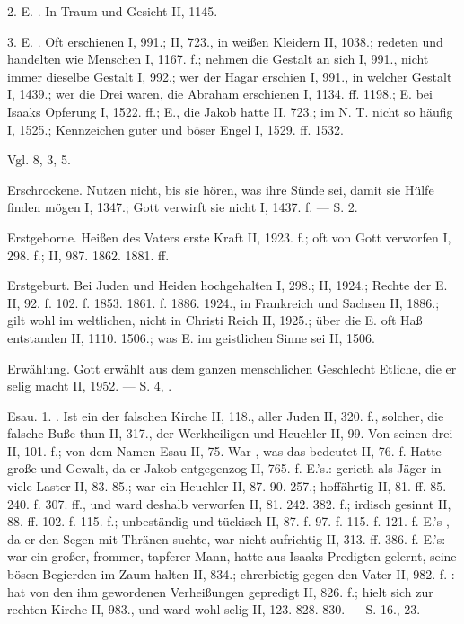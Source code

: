 2. E. . In Traum und Gesicht II, 1145.

3. E. . Oft erschienen I, 991.; II, 723., in weißen Kleidern II, 1038.; redeten und handelten wie Menschen I, 1167. f.; nehmen die Gestalt an sich I, 991., nicht immer dieselbe Gestalt I, 992.; wer der Hagar erschien I, 991., in welcher Gestalt I, 1439.; wer die Drei waren, die Abraham erschienen I, 1134. ff. 1198.; E. bei Isaaks Opferung I, 1522. ff.; E., die Jakob hatte II, 723.; im N. T. nicht so häufig I, 1525.; Kennzeichen guter und böser Engel I, 1529. ff. 1532.

Vgl.  8,  3,  5.

Erschrockene. Nutzen nicht, bis sie hören, was ihre Sünde sei, damit sie Hülfe finden mögen I, 1347.; Gott verwirft sie nicht I, 1437. f. — S.  2.

Erstgeborne. Heißen des Vaters erste Kraft II, 1923. f.; oft von Gott verworfen I, 298. f.; II, 987. 1862. 1881. ff.

Erstgeburt. Bei Juden und Heiden hochgehalten I, 298.; II, 1924.; Rechte der E. II, 92. f. 102. f. 1853. 1861. f. 1886. 1924., in Frankreich und Sachsen II, 1886.; gilt wohl im weltlichen, nicht in Christi Reich II, 1925.; über die E. oft Haß entstanden II, 1110. 1506.; was E. im geistlichen Sinne sei II, 1506.

Erwählung. Gott erwählt aus dem ganzen menschlichen Geschlecht Etliche, die er selig macht II, 1952. — S.  4, .

Esau. 1. . Ist ein  der falschen Kirche II, 118., aller Juden II, 320. f., solcher, die falsche Buße thun II, 317., der Werkheiligen und Heuchler II, 99. Von seinen drei  II, 101. f.; von dem Namen Esau II, 75. War , was das bedeutet II, 76. f. Hatte große  und Gewalt, da er Jakob entgegenzog II, 765. f.  E.’s.: gerieth als Jäger in viele Laster II, 83. 85.; war ein Heuchler II, 87. 90. 257.; hoffährtig II, 81. ff. 85. 240. f. 307. ff., und ward deshalb verworfen II, 81. 242. 382. f.; irdisch gesinnt II, 88. ff. 102. f. 115. f.; unbeständig und tückisch II, 87. f. 97. f. 115. f. 121. f. E.’s , da er den Segen mit Thränen suchte, war nicht aufrichtig II, 313. ff. 386. f.  E.’s: war ein großer, frommer, tapferer Mann, hatte aus Isaaks Predigten gelernt, seine bösen Begierden im Zaum halten II, 834.; ehrerbietig gegen den Vater II, 982. f. : hat von den ihm gewordenen Verheißungen gepredigt II, 826. f.; hielt sich zur rechten Kirche II, 983., und ward wohl selig II, 123. 828. 830. — S.  16.,  23.

